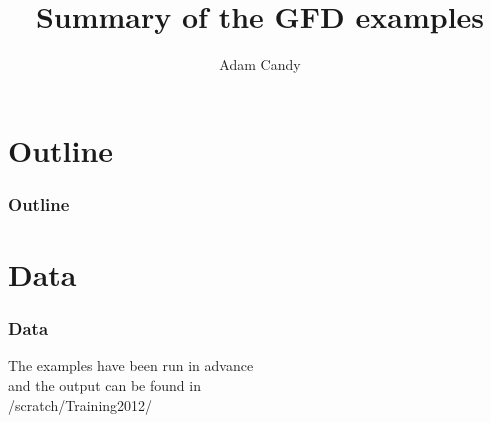 \documentclass[10pt]{beamer}
\title[GFD examples]{Summary of the GFD examples}
\subtitle[]{}
\institute{Department of Earth Science and Engineering, Imperial College London}
\author[Adam Candy]{\large{Adam Candy}}
\date{}
\begin{document}
\begin{frame}
  \titlepage
\end{frame}

\section*{Outline}
\begin{frame}
  \frametitle{Outline}
  \tableofcontents
\end{frame}








\section*{Data}
\begin{frame}
  \frametitle{Data}
  \begin{center}
  The examples have been run in advance \\ and the output can be found in \\
  \vspace{1cm}
  /scratch/Training2012/
  \end{center}
\end{frame}
\end{document}
